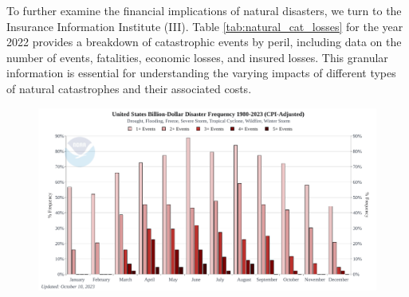\documentclass[12pt]{article}
\begin{document}
\begin{table}[h]
    \caption{NEIC: Billion-Dollar Disasters Data}
    \label{tab:bil_dol_disasters} 
    \centering
    \cite{ncei}
\end{table}



To further examine the financial implications of natural disasters, we turn to the Insurance Information Institute (III)\cite{iii}. 
Table \ref{tab:natural_cat_losses} for the year 2022 provides a breakdown of catastrophic events by peril, including data on the 
number of events, fatalities, economic losses, and insured losses. This granular information is essential for understanding the 
varying impacts of different types of natural catastrophes and their associated costs.

\begin{figure}[ht]
    \centering
    \includegraphics[width=0.8\linewidth]{NCEI US disaster freq.pdf}
    \label{fig:disaster_freq}
    \cite{ncei}
\end{figure}
\end{document}
